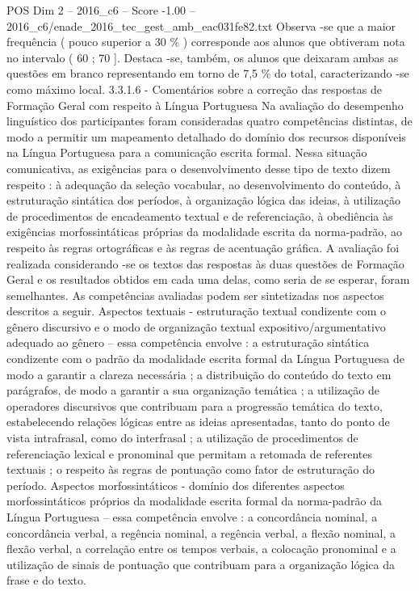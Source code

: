\begin{textsample}{POS Dim 2 – 2016\_c6 – Score -1.00 – 2016\_c6/enade\_2016\_tec\_gest\_amb\_eac031fe82.txt}
Observa -se que a maior frequência ( pouco superior a 30 \% ) corresponde aos alunos que obtiveram nota no intervalo ( 60 ; 70 ].
Destaca -se, também, os alunos que deixaram ambas as questões em branco representando em torno de 7,5 \% do total, caracterizando -se como máximo local. 3.3.1.6 - Comentários sobre a correção das respostas de Formação Geral com respeito à Língua Portuguesa Na avaliação do desempenho linguístico dos participantes foram consideradas quatro competências distintas, de modo a permitir um mapeamento detalhado do domínio dos recursos disponíveis na Língua Portuguesa para a comunicação escrita formal.
Nessa situação comunicativa, as exigências para o desenvolvimento desse tipo de texto dizem respeito : à adequação da seleção vocabular, ao desenvolvimento do conteúdo, à estruturação sintática dos períodos, à organização lógica das ideias, à utilização de procedimentos de encadeamento textual e de referenciação, à obediência às exigências morfossintáticas próprias da modalidade escrita da norma-padrão, ao respeito às regras ortográficas e às regras de acentuação gráfica.
A avaliação foi realizada considerando -se os textos das respostas às duas questões de Formação Geral e os resultados obtidos em cada uma delas, como seria de se esperar, foram semelhantes.
As competências avaliadas podem ser sintetizadas nos aspectos descritos a seguir.
Aspectos textuais - estruturação textual condizente com o gênero discursivo e o modo de organização textual expositivo/argumentativo adequado ao gênero – essa competência envolve : a estruturação sintática condizente com o padrão da modalidade escrita formal da Língua Portuguesa de modo a garantir a clareza necessária ; a distribuição do conteúdo do texto em parágrafos, de modo a garantir a sua organização temática ; a utilização de operadores discursivos que contribuam para a progressão temática do texto, estabelecendo relações lógicas entre as ideias apresentadas, tanto do ponto de vista intrafrasal, como do interfrasal ; a utilização de procedimentos de referenciação lexical e pronominal que permitam a retomada de referentes textuais ; o respeito às regras de pontuação como fator de estruturação do período.
Aspectos morfossintáticos - domínio dos diferentes aspectos morfossintáticos próprios da modalidade escrita formal da norma-padrão da Língua Portuguesa – essa competência envolve : a concordância nominal, a concordância verbal, a regência nominal, a regência verbal, a flexão nominal, a flexão verbal, a correlação entre os tempos verbais, a colocação pronominal e a utilização de sinais de pontuação que contribuam para a organização lógica da frase e do texto.

\end{textsample}
